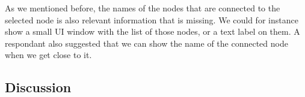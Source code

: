 As we mentioned before, the names of the nodes that are connected to the selected node is also relevant information that is missing. We could for instance show a small UI window with the list of those nodes, or a text label on them. A respondant also suggested that we can show the name of the connected node when we get close to it.

\subsection{Discussion}


%


